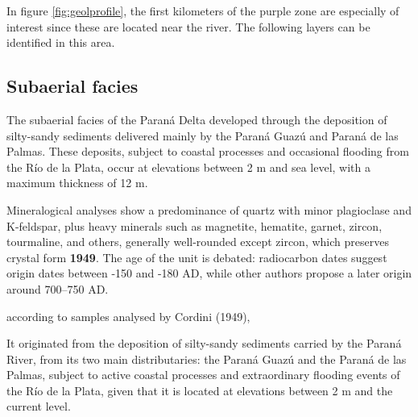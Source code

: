 In figure \ref{fig:geolprofile}, the first kilometers of the purple zone are especially of interest since these are located near the river. The following layers can be identified in this area.

\subsection{Subaerial facies}
The subaerial facies of the Paraná Delta developed through the deposition of silty-sandy sediments delivered mainly by the Paraná Guazú and Paraná de las Palmas. These deposits, subject to coastal processes and occasional flooding from the Río de la Plata, occur at elevations between 2 m and sea level, with a maximum thickness of 12 m.

Mineralogical analyses show a predominance of quartz with minor plagioclase and K-feldspar, plus heavy minerals such as magnetite, hematite, garnet, zircon, tourmaline, and others, generally well-rounded except zircon, which preserves crystal form \textbf{1949}. The age of the unit is debated: radiocarbon dates suggest origin dates between -150 and -180 AD, while other authors propose a later origin around 700–750 AD.




according to samples analysed by Cordini (1949), 

It originated from the deposition
of silty-sandy sediments carried by the Paraná River,
from its two main distributaries: the Paraná Guazú
and the Paraná de las Palmas, subject to active coastal processes
and extraordinary flooding events of the Río de la Plata,
given that it is located at elevations between 2
m and the current level.